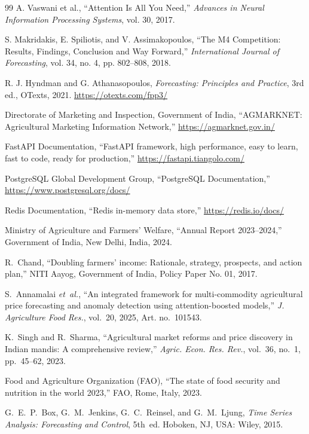 \documentclass[12pt,a4paper]{report}
\begin{document}
\begin{thebibliography}{99}
A. Vaswani et al.,
``Attention Is All You Need,''
\textit{Advances in Neural Information Processing Systems}, vol. 30, 2017.

S. Makridakis, E. Spiliotis, and V. Assimakopoulos,
``The M4 Competition: Results, Findings, Conclusion and Way Forward,''
\textit{International Journal of Forecasting}, vol. 34, no. 4, pp. 802--808, 2018.

R. J. Hyndman and G. Athanasopoulos,
\textit{Forecasting: Principles and Practice}, 3rd ed.,
OTexts, 2021. \url{https://otexts.com/fpp3/}

Directorate of Marketing and Inspection, Government of India,
``AGMARKNET: Agricultural Marketing Information Network,''
\url{https://agmarknet.gov.in/}

FastAPI Documentation,
``FastAPI framework, high performance, easy to learn, fast to code, ready for production,''
\url{https://fastapi.tiangolo.com/}

PostgreSQL Global Development Group,
``PostgreSQL Documentation,''
\url{https://www.postgresql.org/docs/}

Redis Documentation,
``Redis in-memory data store,''
\url{https://redis.io/docs/}

 Ministry of Agriculture and Farmers' Welfare, ``Annual Report 2023--2024,'' Government of India, New Delhi, India, 2024.

 R.~Chand, ``Doubling farmers' income: Rationale, strategy, prospects, and action plan,'' NITI Aayog, Government of India, Policy Paper No. 01, 2017.

 S.~Annamalai \textit{et~al.}, ``An integrated framework for multi-commodity agricultural price forecasting and anomaly detection using attention-boosted models,'' \textit{J. Agriculture Food Res.}, vol.~20, 2025, Art. no.~101543.

 K.~Singh and R.~Sharma, ``Agricultural market reforms and price discovery in Indian mandis: A comprehensive review,'' \textit{Agric. Econ. Res. Rev.}, vol.~36, no.~1, pp.~45--62, 2023.

 Food and Agriculture Organization (FAO), ``The state of food security and nutrition in the world 2023,'' FAO, Rome, Italy, 2023.

 G.~E.~P.~Box, G.~M.~Jenkins, G.~C.~Reinsel, and G.~M.~Ljung, \textit{Time Series Analysis: Forecasting and Control}, 5th~ed. Hoboken, NJ, USA: Wiley, 2015.


\end{thebibliography}
\end{document}
